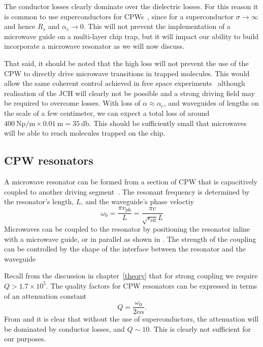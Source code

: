 The conductor losses clearly dominate over the dielectric losses. For this
reason it is common to use superconductors for CPWs~\cite{}, since for a
superconductor $\sigma \to \infty$ and hence $R_s$ and $\alpha_c \to 0$.
This will not prevent the implementation of a microwave guide on a multi-layer
chip trap, but it will impact our ability to build incorporate a microwave
resonator as we will now discuss.

That said, it should be noted that the high loss will not prevent the use of
the CPW to directly drive microwave transitions in trapped molecules. This
would allow the same coherent control achieved in free space
experiments~\cite{WilliamsMagnetic2018} although
realisation of the JCH will clearly not be possible and a strong driving field
may be required to overcome losses.  With loss of $\alpha \approx \alpha_c$,
and waveguides of lengths on the scale of a few centimeter, we can expect a
total loss of around $\SI{400}{\neper\per\metre} \times \SI{0.01}{\metre} =
\SI{35}{\decibel}$. This should be sufficiently small that microwaves will be
able to reach molecules trapped on the chip.~\cite{Treutlein2008}

\subsection{CPW resonators}
\label{mws:resonators}

A microwave resonator can be formed from a section of CPW that is capacitively
coupled to another driving segment~\cite{Day2003}. The resonant frequency is
determined by the resonator's length, $L$, and the waveguide's phase
veloctiy~\cite{Simons2004}
%
\begin{equation}
  \omega_0 = \frac{\pi v_\text{ph}}{L} = \frac{\pi
  c}{\sqrt{\epsilon_\text{eff}} L}
\end{equation}
%
Microwaves can be coupled to the resonator by positioning the resonator inline
with a microwave guide, or in parallel as shown in . The strength of the coupling can be controlled by the shape of the
interface between the resonator and the waveguide~\cite{doi:10.1063/1.3010859}

Recall from the discussion in chapter~\ref{theory} that for strong coupling we
require $Q > 1.7 \times 10^5$. The quality factors for CPW resonators can be
expressed in terms of an attenuation constant
%
\begin{equation}
  Q = \frac{\omega_0}{2c\alpha}.
  \label{mws:eqn:Qalpha}
\end{equation}
%
From  and  it is
clear that without the use of superconductors, the attenuation will be
dominated by conductor losses, and $Q\sim10$. This is clearly not sufficient
for our purposes.

